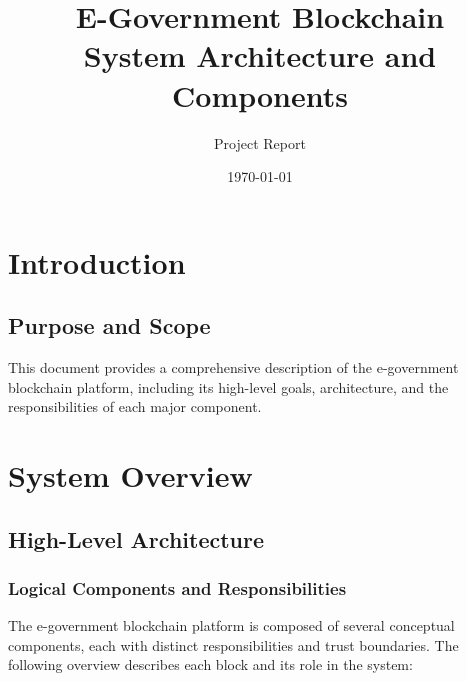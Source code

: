\documentclass[12pt,a4paper]{report}
\title{E-Government Blockchain\\System Architecture and Components}
\author{Project Report}
\date{\today}
\begin{document}
\maketitle
{}

\begin{abstract}
\end{abstract}

\tableofcontents
\cleardoublepage
{}

\chapter{Introduction}
\section{Purpose and Scope}
This document provides a comprehensive description of the e-government blockchain platform, including its high-level goals, architecture, and the responsibilities of each major component.

\chapter{System Overview}
\section{High-Level Architecture}

\subsection{Logical Components and Responsibilities}
The e-government blockchain platform is composed of several conceptual components, each with distinct responsibilities and trust boundaries. The following overview describes each block and its role in the system:
\end{document}

